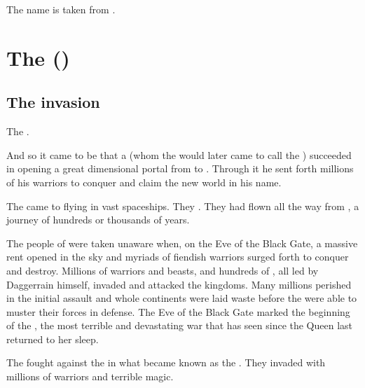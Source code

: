 The name \quo{\Shuggon} is taken from \cite{HPLovecraft:TheBlackTomeofAlsophocus}. 














\section{The \FirstBanewar ()}









\subsection{The \bane{} invasion}
\index{\firstbanewar}
The \banes {}.

And so it came to be that a \baneking{} (whom the \dragons{} would later came to call the \quo{\Voidbringer}) succeeded in opening a great dimensional portal from \Erebos{} to \Miith{}. 
Through it he sent forth millions of his \bane{} warriors to conquer and claim the new world in his name. 

The \banes{} came to \Miith{} flying in vast spaceships. They . 
They had flown all the way from \Erebos{}, a journey of hundreds or thousands of years. 

The people of \Miith{} were taken unaware when, on the Eve of the Black Gate, a massive rent opened in the sky and myriads of fiendish \bane{} warriors surged forth to conquer and destroy. 
Millions of \bane{} warriors and beasts, and hundreds of \banelords, all led by Daggerrain himself, invaded and attacked the \draconic{} kingdoms. 
Many millions perished in the initial assault and whole continents were laid waste before the \ophidians{} were able to muster their forces in defense. 
The Eve of the Black Gate marked the beginning of the \Banewar, the most terrible and devastating war that \Miith{} has seen since the \Kraken{} Queen last returned to her sleep. 

The \banes{} fought against the \ophidians{} in what became known as the \firstbanewar. 
They invaded with millions of \bane{} warriors and terrible magic. 





